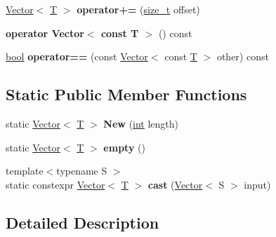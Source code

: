 \begin{DoxyCompactItemize}
\mbox{\hyperlink{classv8_1_1internal_1_1Vector}{Vector}}$<$ \mbox{\hyperlink{classv8_1_1internal_1_1torque_1_1T}{T}} $>$ {\bfseries operator+=} (\mbox{\hyperlink{classsize__t}{size\+\_\+t}} offset)
\item 
\mbox{\label{classv8_1_1internal_1_1Vector_a0a4e6fb6f9bc52b8afb0ceffbc5b7d84}} 
{\bfseries operator Vector$<$ const T $>$} () const
\item 
\mbox{\label{classv8_1_1internal_1_1Vector_a356adac3ad59542876dd38b8cc539cdf}} 
\mbox{\hyperlink{classbool}{bool}} {\bfseries operator==} (const \mbox{\hyperlink{classv8_1_1internal_1_1Vector}{Vector}}$<$ const \mbox{\hyperlink{classv8_1_1internal_1_1torque_1_1T}{T}} $>$ other) const
\end{DoxyCompactItemize}
\subsection*{Static Public Member Functions}
\begin{DoxyCompactItemize}
\item 
\mbox{\label{classv8_1_1internal_1_1Vector_adb4189b3dc89e2c2dfd532c5615ead33}} 
static \mbox{\hyperlink{classv8_1_1internal_1_1Vector}{Vector}}$<$ \mbox{\hyperlink{classv8_1_1internal_1_1torque_1_1T}{T}} $>$ {\bfseries New} (\mbox{\hyperlink{classint}{int}} length)
\item 
\mbox{\label{classv8_1_1internal_1_1Vector_a5a178ac96e3a64e7f2addc3b201285fd}} 
static \mbox{\hyperlink{classv8_1_1internal_1_1Vector}{Vector}}$<$ \mbox{\hyperlink{classv8_1_1internal_1_1torque_1_1T}{T}} $>$ {\bfseries empty} ()
\item 
\mbox{\label{classv8_1_1internal_1_1Vector_ad3b26a766b09ae0a07049b9262c6dc75}} 
{\footnotesize template$<$typename S $>$ }\\static constexpr \mbox{\hyperlink{classv8_1_1internal_1_1Vector}{Vector}}$<$ \mbox{\hyperlink{classv8_1_1internal_1_1torque_1_1T}{T}} $>$ {\bfseries cast} (\mbox{\hyperlink{classv8_1_1internal_1_1Vector}{Vector}}$<$ S $>$ input)
\end{DoxyCompactItemize}


\subsection{Detailed Description}
